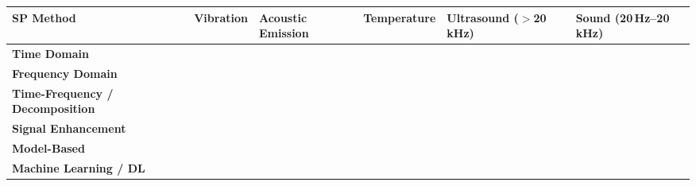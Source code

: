 \begin{table}[H]
\scriptsize
\centering
\renewcommand{\arraystretch}{1.3}
\setlength{\tabcolsep}{4pt}
\begin{tabularx}{\linewidth}{|
>{\raggedright\arraybackslash}p{2.2cm}
| X | X | X | X | X |}
\hline
\textbf{SP Method}
& \textbf{Vibration}
& \textbf{Acoustic Emission}
& \textbf{Temperature}
& \textbf{Ultrasound ($>$20\,kHz)}
& \textbf{Sound (20\,Hz--20\,kHz)}
\\
\hline
\textbf{Time Domain}
& \cite{jakobsen_detecting_2023} \cite{zhang_graph-data-based_2024} \cite{tandon_condition_2007} \cite{cornel_condition_2021} \cite{jakobsen_vibration_2021} \cite{xu_vibration-based_2024} \cite{jakobsen_low_2024} \cite{wang_advanced_2024} \cite{marticorena_rolling_2022}
& \cite{zhang_graph-data-based_2024} \cite{miettinen_analysis_2001} \cite{tandon_condition_2007} \cite{cornel_condition_2021} \cite{kestel_condition_2025} \cite{hou_-situ_2025} \cite{delft_university_of_technology_tu_delft_influence_2024} \cite{marticorena_rolling_2022} \cite{wang_advanced_2024} \cite{yoshioka_monitoring_2009} \cite{usgame_sandoval_acoustic_2013} \cite{zhang_health_2025} \cite{renhart_monitoring_2021}
& \cite{zhang_graph-data-based_2024} \cite{moussa_passive_2017} \cite{cen_film_2019} \cite{wang_advanced_2024}
& \cite{jakobsen_detecting_2023} \cite{jakobsen_low_2024} \cite{lineham_ultrasonic_2008}
&
\\
\hline
\textbf{Frequency Domain}
& \cite{zhang_graph-data-based_2024} \cite{jakobsen_vibration_2021} \cite{xu_vibration-based_2024} \cite{jakobsen_low_2024}
& \cite{zhang_graph-data-based_2024} \cite{kestel_condition_2025} \cite{marticorena_rolling_2022} \cite{yoshioka_monitoring_2009} \cite{renhart_monitoring_2021} \cite{scheeren_acoustic_2024}
& \cite{zhang_graph-data-based_2024}
& \cite{jakobsen_low_2024}
& \cite{georgiev_microphone_2017}
\\
\hline
\textbf{Time-Frequency / Decomposition}
& \cite{jakobsen_vibration_2021} \cite{xu_vibration-based_2024}
& \cite{kestel_condition_2025} \cite{renhart_monitoring_2021}
&
&
&
\\
\hline
\textbf{Signal Enhancement}
& \cite{xu_vibration-based_2024}
& \cite{renhart_monitoring_2021}
&
&
& \cite{herwig_signal_2025} \cite{pacheco-cherrez_bearing_2022}
\\
\hline
\textbf{Model-Based}
& \cite{jakobsen_detecting_2023}
&  \cite{hou_-situ_2025}
& \cite{moussa_passive_2017}
&
&
\\
\hline
\textbf{Machine Learning / DL}
& \cite{zhang_graph-data-based_2024} \cite{wang_advanced_2024}

\end{tabularx}
\end{table}

